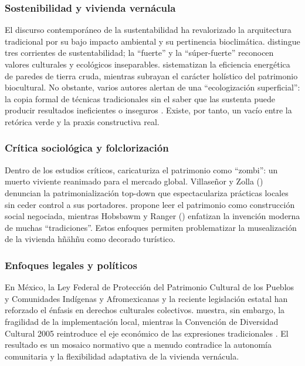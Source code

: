 \subsubsection{Sostenibilidad y vivienda vernácula}

El discurso contemporáneo de la sustentabilidad ha revalorizado la arquitectura tradicional por su bajo impacto ambiental y su pertinencia bioclimática. \cite{gudynas2010desarrollo} distingue tres corrientes de sustentabilidad; la ``fuerte'' y la ``súper-fuerte'' reconocen valores culturales y ecológicos inseparables. \cite{larraga2014sust} sistematizan la eficiencia energética de paredes de tierra cruda, mientras \cite{chang2010patrimonio} subrayan el carácter holístico del patrimonio biocultural.  No obstante, varios autores alertan de una ``ecologización superficial'': la copia formal de técnicas tradicionales sin el saber que las sustenta puede producir resultados ineficientes o inseguros \cite{gandara2000, sanchez2016adobeBTC}.  Existe, por tanto, un vacío entre la retórica verde y la praxis constructiva real.

\subsubsection{Crítica sociológica y folclorización}

Dentro de los estudios críticos, \cite{i2008zombi} caricaturiza el patrimonio como ``zombi'': un muerto viviente reanimado para el mercado global.  Villaseñor y Zolla (\citeyear{villasenor2012patrimonio}) denuncian la patrimonialización top-down que espectaculariza prácticas locales sin ceder control a sus portadores. \cite{malavassi2017patrimonio} propone leer el patrimonio como construcción social negociada, mientras Hobsbawm y Ranger (\citeyear{hobsbawm1983inventar}) enfatizan la invención moderna de muchas ``tradiciones''.  Estos enfoques permiten problematizar la musealización de la vivienda hñähñu como decorado turístico.

\subsubsection{Enfoques legales y políticos}

En México, la Ley Federal de Protección del Patrimonio Cultural de los Pueblos y Comunidades Indígenas y Afromexicanas \cite{ley2023patrimonio} y la reciente legislación estatal han reforzado el énfasis en derechos culturales colectivos. \cite{sanchez2013legislacion} muestra, sin embargo, la fragilidad de la implementación local, mientras la Convención de Diversidad Cultural 2005 reintroduce el eje económico de las expresiones tradicionales \cite{UNESCO2005diversidad}.  El resultado es un mosaico normativo que a menudo contradice la autonomía comunitaria y la flexibilidad adaptativa de la vivienda vernácula.

